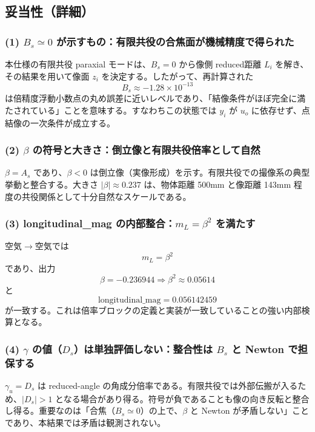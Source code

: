 \subsection{妥当性（詳細）}

\subsubsection*{(1) $B_s \simeq 0$ が示すもの：有限共役の合焦面が機械精度で得られた}
本仕様の有限共役 paraxial モードは、$B_s=0$ から像側 reduced距離 $L_i$ を解き、その結果を用いて像面 $z_i$ を決定する。したがって、再計算された
\[
B_s \approx -1.28\times 10^{-13}
\]
は倍精度浮動小数点の丸め誤差に近いレベルであり、「結像条件がほぼ完全に満たされている」ことを意味する。すなわちこの状態では $y_i$ が $u_o$ に依存せず、点結像の一次条件が成立する。

\subsubsection*{(2) $\beta$ の符号と大きさ：倒立像と有限共役倍率として自然}
$\beta=A_s$ であり、$\beta<0$ は倒立像（実像形成）を示す。有限共役での撮像系の典型挙動と整合する。大きさ $|\beta|\approx 0.237$ は、物体距離 500mm と像距離 143mm 程度の共役関係として十分自然なスケールである。

\subsubsection*{(3) longitudinal\_mag の内部整合：$m_L=\beta^2$ を満たす}
空気$\to$空気では
\[
m_L=\beta^2
\]
であり、出力
\[
\beta=-0.236944 \Rightarrow \beta^2\approx 0.05614
\]
と
\[
\mathrm{longitudinal\_mag}=0.056142459
\]
が一致する。これは倍率ブロックの定義と実装が一致していることの強い内部検算となる。

\subsubsection*{(4) $\gamma$ の値（$D_s$）は単独評価しない：整合性は $B_s$ と Newton で担保する}
$\gamma_u=D_s$ は reduced-angle の角成分倍率である。有限共役では外部伝搬が入るため、$|D_s|>1$ となる場合があり得る。符号が負であることも像の向き反転と整合し得る。重要なのは「合焦（$B_s\simeq 0$）の上で、$\beta$ と Newton が矛盾しない」ことであり、本結果では矛盾は観測されない。

